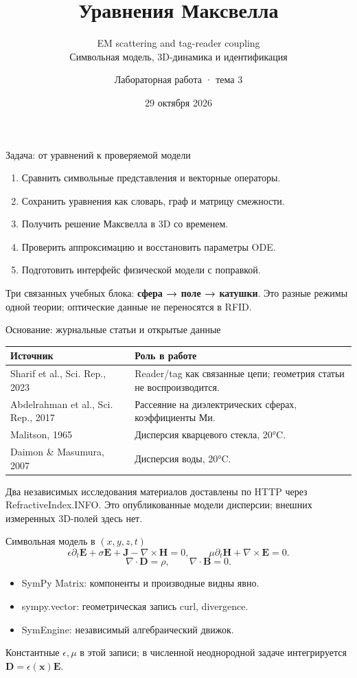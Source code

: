 \documentclass[aspectratio=169,11pt]{beamer}
\title{Уравнения Максвелла}
\subtitle{EM scattering and tag-reader coupling\\Символьная модель, 3D-динамика и идентификация}
\author{Лабораторная работа · тема 3}
\date{29 октября 2026}
\begin{document}
\begin{frame}\titlepage\end{frame}

\begin{frame}{Задача: от уравнений к проверяемой модели}
\begin{enumerate}
\item Сравнить символьные представления и векторные операторы.
\item Сохранить уравнения как словарь, граф и матрицу смежности.
\item Получить решение Максвелла в 3D со временем.
\item Проверить аппроксимацию и восстановить параметры ODE.
\item Подготовить интерфейс физической модели с поправкой.
\end{enumerate}
\vspace{3mm}
Три связанных учебных блока: \textbf{сфера → поле → катушки}. Это разные режимы одной теории; оптические данные не переносятся в RFID.
\end{frame}

\begin{frame}{Основание: журнальные статьи и открытые данные}
\small
\begin{tabular}{p{}p{}}
\toprule Источник & Роль в работе\\\midrule
Sharif et al., Sci. Rep., 2023 & Reader/tag как связанные цепи; геометрия статьи не воспроизводится.\\[2mm]
Abdelrahman et al., Sci. Rep., 2017 & Рассеяние на диэлектрических сферах, коэффициенты Ми.\\[2mm]
Malitson, 1965 & Дисперсия кварцевого стекла, 20°C.\\[2mm]
Daimon \& Masumura, 2007 & Дисперсия воды, 20°C.\\\bottomrule
\end{tabular}
\vspace{3mm}
Два независимых исследования материалов доставлены по HTTP через RefractiveIndex.INFO. Это опубликованные модели дисперсии; внешних измеренных 3D-полей здесь нет.
\end{frame}

\begin{frame}{Символьная модель в $(x,y,z,t)$}
\[
\epsilon\partial_t\mathbf E+\sigma\mathbf E+\mathbf J-\nabla\times\mathbf H=0,
\qquad \mu\partial_t\mathbf H+\nabla\times\mathbf E=0.
\]
\[\nabla\cdot\mathbf D=\rho,\qquad\nabla\cdot\mathbf B=0.\]
\begin{itemize}
\item SymPy Matrix: компоненты и производные видны явно.
\item sympy.vector: геометрическая запись curl, divergence.
\item SymEngine: независимый алгебраический движок.
\end{itemize}
Константные $\epsilon,\mu$ в этой записи; в численной неоднородной задаче интегрируется $\mathbf D=\epsilon(\mathbf x)\mathbf E$.
\end{frame}
\end{document}
